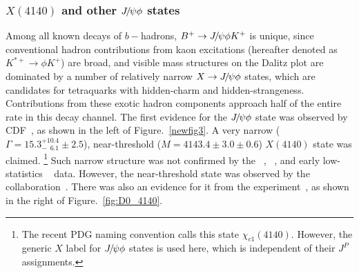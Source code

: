 \subsubsection{$X(4140)$ and other ${{J\mskip -3mu/\mskip -2mu\psi}}\phi$ states}

Among all known decays of $b-$hadrons,
${{{B}^+}}\rightarrow{\ensuremath{{J\mskip -3mu/\mskip -2mu\psi}}}\phi K^+$ is unique, 
since conventional hadron contributions from kaon excitations (hereafter denoted as $K^{*+}\to\phi K^+$) are broad, 
and visible mass structures on the Dalitz plot are dominated by a number of relatively narrow $X\rightarrow{\ensuremath{{J\mskip -3mu/\mskip -2mu\psi}}}\phi$ states, 
which are candidates for tetraquarks with hidden-charm and hidden-strangeness. 
Contributions from these exotic hadron components approach half of the entire rate in this decay channel.
The first evidence for the ${{J\mskip -3mu/\mskip -2mu\psi}}\phi$ state was observed by CDF~\supercite{Aaltonen:2011at},
as shown in the left of Figure.~\ref{newfig3}.
A very narrow ($\Gamma=15.3_{-\phantom{1}6.1}^{+10.4}\pm2.5$\mev), 
near-threshold ($M=4143.4\pm3.0\pm0.6$\mev)
$X(4140)$ state was claimed.
\footnote{The recent PDG\supercite{PDG2020} naming convention calls this state $\chi_{c1}(4140)$. 
However, the generic $X$ label for ${{J\mskip -3mu/\mskip -2mu\psi}}\phi$ states is used here, 
which is independent of their $J^P$ assignments.}
Such narrow structure was not confirmed by the \belle~\supercite{ChengPing:2009vu}, 
\babar~\supercite{Lees:2014lra}, 
and early low-statistics \lhcb~\supercite{LHCb-PAPER-2011-033} data. 
However, 
the near-threshold state was observed by the \cms collaboration~\supercite{Chatrchyan:2013dma}. 
There was also an evidence for it from the \dzero experiment~\supercite{Abazov:2015sxa},
as shown in the right of Figure.~\ref{fig:D0_4140}.

